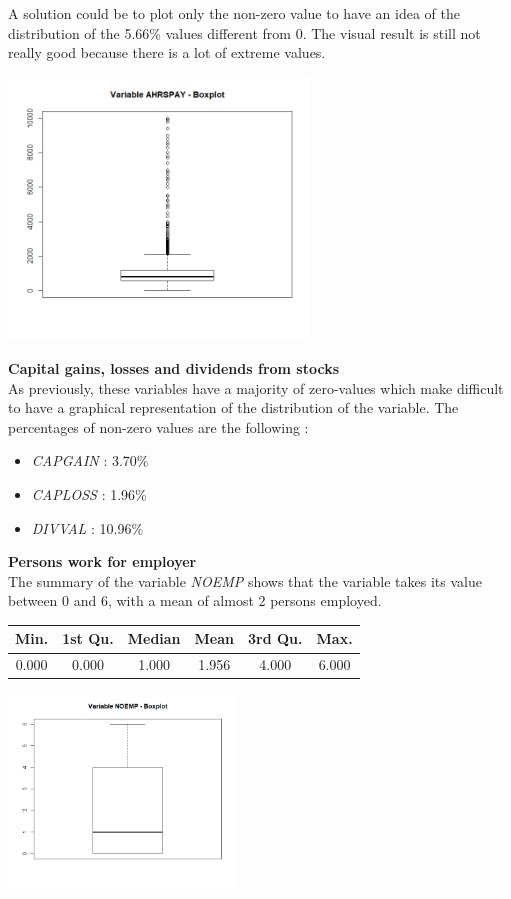 \documentclass{article}
\begin{document}
\noindent A solution could be to plot only the non-zero value to have an idea of the distribution of the 5.66\% values different from 0. The visual result is still not really good because there is a lot of extreme values.\\
\begin{center}
\includegraphics[width = 8cm]{AHRSPAY.png}
\end{center}

\noindent\textbf{Capital gains, losses and dividends from stocks}\\

\noindent As previously, these variables have a majority of zero-values which make difficult to have a graphical representation of the distribution of the variable. The percentages of non-zero values are the following :
\begin{itemize}
    \item \textit{CAPGAIN} : 3.70\%
    \item \textit{CAPLOSS} : 1.96\%
    \item \textit{DIVVAL} : 10.96\% 
\end{itemize}

\vspace{0.5 cm}
\noindent\textbf{Persons work for employer}\\

\noindent The summary of the variable \textit{NOEMP} shows that the variable takes its value between $0$ and $6$, with a mean of almost 2 persons employed.\\
\begin{center}
\begin{tabular}{c|c|c|c|c|c}
Min. & 1st Qu. &  Median & Mean & 3rd Qu. & Max. \\
\hline
0.000 & 0.000 & 1.000 & 1.956 & 4.000 & 6.000  \\
\end{tabular}
\end{center}
\begin{center}
\includegraphics[width = 6cm]{NOEMP.png}
\end{center}
\end{document}
